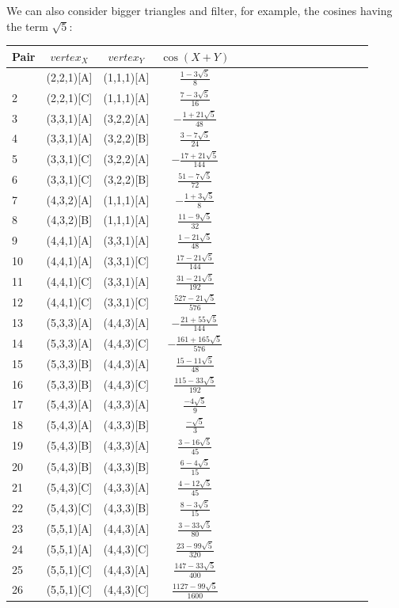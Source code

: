 \documentclass[11pt]{article}
\begin{document}
We can also consider bigger triangles and filter, for example, the cosines having the term $\sqrt{5}$:
\begin{longtable}{ | p{1cm}| *{15}{c|} }
\hline
Pair & $vertex_X$ & $vertex_Y$ & $\cos(X+Y)$ \\
\hline\endhead
\hline\endfoot
1 & (2,2,1)[A] & (1,1,1)[A] & $\frac{1-3\sqrt{5}}{8}$\\ %
2 & (2,2,1)[C] & (1,1,1)[A] & $\frac{7-3\sqrt{5}}{16}$\\ %
3 & (3,3,1)[A] & (3,2,2)[A] & $-\frac{1+21\sqrt{5}}{48}$\\ %
4 & (3,3,1)[A] & (3,2,2)[B] & $\frac{3-7\sqrt{5}}{24}$\\ %
5 & (3,3,1)[C] & (3,2,2)[A] & $-\frac{17+21\sqrt{5}}{144}$\\ %
6 & (3,3,1)[C] & (3,2,2)[B] & $\frac{51-7\sqrt{5}}{72}$\\ %
7 & (4,3,2)[A] & (1,1,1)[A] & $-\frac{1+3\sqrt{5}}{8}$\\ %
8 & (4,3,2)[B] & (1,1,1)[A] & $\frac{11-9\sqrt{5}}{32}$\\ %
9 & (4,4,1)[A] & (3,3,1)[A] & $\frac{1-21\sqrt{5}}{48}$\\ %
10 & (4,4,1)[A] & (3,3,1)[C] & $\frac{17-21\sqrt{5}}{144}$\\ %
11 & (4,4,1)[C] & (3,3,1)[A] & $\frac{31-21\sqrt{5}}{192}$\\ %
12 & (4,4,1)[C] & (3,3,1)[C] & $\frac{527-21\sqrt{5}}{576}$\\ %
13 & (5,3,3)[A] & (4,4,3)[A] & $-\frac{21+55\sqrt{5}}{144}$\\ %
14 & (5,3,3)[A] & (4,4,3)[C] & $-\frac{161+165\sqrt{5}}{576}$\\ %
15 & (5,3,3)[B] & (4,4,3)[A] & $\frac{15-11\sqrt{5}}{48}$\\ %
16 & (5,3,3)[B] & (4,4,3)[C] & $\frac{115-33\sqrt{5}}{192}$\\ %
17 & (5,4,3)[A] & (4,3,3)[A] & $\frac{-4\sqrt{5}}{9}$\\ %
18 & (5,4,3)[A] & (4,3,3)[B] & $\frac{-\sqrt{5}}{3}$\\ %
19 & (5,4,3)[B] & (4,3,3)[A] & $\frac{3-16\sqrt{5}}{45}$\\ %
20 & (5,4,3)[B] & (4,3,3)[B] & $\frac{6-4\sqrt{5}}{15}$\\ %
21 & (5,4,3)[C] & (4,3,3)[A] & $\frac{4-12\sqrt{5}}{45}$\\ %
22 & (5,4,3)[C] & (4,3,3)[B] & $\frac{8-3\sqrt{5}}{15}$\\ %
23 & (5,5,1)[A] & (4,4,3)[A] & $\frac{3-33\sqrt{5}}{80}$\\ %
24 & (5,5,1)[A] & (4,4,3)[C] & $\frac{23-99\sqrt{5}}{320}$\\ %
25 & (5,5,1)[C] & (4,4,3)[A] & $\frac{147-33\sqrt{5}}{400}$\\ %
26 & (5,5,1)[C] & (4,4,3)[C] & $\frac{1127-99\sqrt{5}}{1600}$\\ %
\end{longtable}
\end{document}
